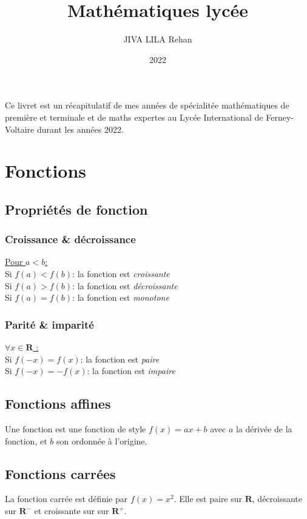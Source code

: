 \documentclass{article}
\title{Mathématiques lycée}
\author{JIVA LILA Rehan}
\date{2022\textemdash 2024}
\begin{document}
\maketitle
    Ce livret est un récapitulatif de mes années de spécialitée mathématiques de première et terminale et de maths expertes au Lycée International de Ferney-Voltaire durant les années 2022.

\tableofcontents

\pagebreak



\section{Fonctions}


\subsection{Propriétés de fonction}

\subsubsection{Croissance \& décroissance}
    \underline{Pour $a<b$:}\\
    Si $f(a) < f(b)$: la fonction est \emph{croissante}\\
    Si $f(a) > f(b)$: la fonction est \emph{décroissante}\\
    Si $f(a) = f(b)$: la fonction est \emph{monotone}

\subsubsection{Parité \& imparité}
    \underline{$\forall x \in \mathbf{R}$ :}\\
    Si $f(-x) = f(x)$: la fonction est \emph{paire}\\
    Si $f(-x) = -f(x)$: la fonction est \emph{impaire}


\subsection{Fonctions affines}
    Une fonction est une fonction de style $f(x) = ax+b$ avec $a$ la dérivée de la fonction, et $b$ son ordonnée à l'origine.


\subsection{Fonctions carrées}
    La fonction carrée est définie par $f(x) = x^2$. Elle est paire sur $\mathbf{R}$, décroissante sur $\mathbf{R^-}$ et croissante sur sur $\mathbf{R^+}$.
\end{document}
